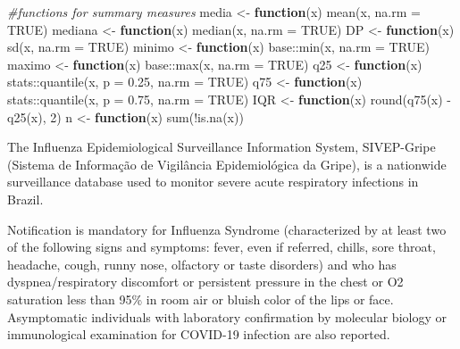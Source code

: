 \documentclass[
]{article}
\newenvironment{Shaded}{\begin{snugshade}}{\end{snugshade}}
\newcommand{\AttributeTok}[1]{\textcolor[rgb]{0.77,0.63,0.00}{#1}}
\newcommand{\CommentTok}[1]{\textcolor[rgb]{0.56,0.35,0.01}{\textit{#1}}}
\newcommand{\ConstantTok}[1]{\textcolor[rgb]{0.00,0.00,0.00}{#1}}
\newcommand{\ControlFlowTok}[1]{\textcolor[rgb]{0.13,0.29,0.53}{\textbf{#1}}}
\newcommand{\DecValTok}[1]{\textcolor[rgb]{0.00,0.00,0.81}{#1}}
\newcommand{\FloatTok}[1]{\textcolor[rgb]{0.00,0.00,0.81}{#1}}
\newcommand{\FunctionTok}[1]{\textcolor[rgb]{0.00,0.00,0.00}{#1}}
\newcommand{\NormalTok}[1]{#1}
\newcommand{\OtherTok}[1]{\textcolor[rgb]{0.56,0.35,0.01}{#1}}
\newcommand{\SpecialCharTok}[1]{\textcolor[rgb]{0.00,0.00,0.00}{#1}}
\begin{document}
\begin{Shaded}
\begin{Highlighting}[]
\CommentTok{\#functions for summary measures}
\NormalTok{media }\OtherTok{\textless{}{-}} \ControlFlowTok{function}\NormalTok{(x)}
  \FunctionTok{mean}\NormalTok{(x, }\AttributeTok{na.rm =} \ConstantTok{TRUE}\NormalTok{)}
\NormalTok{mediana }\OtherTok{\textless{}{-}} \ControlFlowTok{function}\NormalTok{(x)}
  \FunctionTok{median}\NormalTok{(x, }\AttributeTok{na.rm =} \ConstantTok{TRUE}\NormalTok{)}
\NormalTok{DP }\OtherTok{\textless{}{-}} \ControlFlowTok{function}\NormalTok{(x)}
  \FunctionTok{sd}\NormalTok{(x, }\AttributeTok{na.rm =} \ConstantTok{TRUE}\NormalTok{)}
\NormalTok{minimo }\OtherTok{\textless{}{-}} \ControlFlowTok{function}\NormalTok{(x)}
\NormalTok{  base}\SpecialCharTok{::}\FunctionTok{min}\NormalTok{(x, }\AttributeTok{na.rm =} \ConstantTok{TRUE}\NormalTok{)}
\NormalTok{maximo }\OtherTok{\textless{}{-}} \ControlFlowTok{function}\NormalTok{(x)}
\NormalTok{  base}\SpecialCharTok{::}\FunctionTok{max}\NormalTok{(x, }\AttributeTok{na.rm =} \ConstantTok{TRUE}\NormalTok{)}
\NormalTok{q25 }\OtherTok{\textless{}{-}} \ControlFlowTok{function}\NormalTok{(x)}
\NormalTok{  stats}\SpecialCharTok{::}\FunctionTok{quantile}\NormalTok{(x, }\AttributeTok{p =} \FloatTok{0.25}\NormalTok{, }\AttributeTok{na.rm =} \ConstantTok{TRUE}\NormalTok{)}
\NormalTok{q75 }\OtherTok{\textless{}{-}} \ControlFlowTok{function}\NormalTok{(x)}
\NormalTok{  stats}\SpecialCharTok{::}\FunctionTok{quantile}\NormalTok{(x, }\AttributeTok{p =} \FloatTok{0.75}\NormalTok{, }\AttributeTok{na.rm =} \ConstantTok{TRUE}\NormalTok{)}
\NormalTok{IQR }\OtherTok{\textless{}{-}} \ControlFlowTok{function}\NormalTok{(x)}
  \FunctionTok{round}\NormalTok{(}\FunctionTok{q75}\NormalTok{(x) }\SpecialCharTok{{-}} \FunctionTok{q25}\NormalTok{(x), }\DecValTok{2}\NormalTok{)}
\NormalTok{n }\OtherTok{\textless{}{-}} \ControlFlowTok{function}\NormalTok{(x)}
  \FunctionTok{sum}\NormalTok{(}\SpecialCharTok{!}\FunctionTok{is.na}\NormalTok{(x))}
\end{Highlighting}
\end{Shaded}

The Influenza Epidemiological Surveillance Information System,
SIVEP-Gripe (Sistema de Informação de Vigilância Epidemiológica da
Gripe), is a nationwide surveillance database used to monitor severe
acute respiratory infections in Brazil.

Notification is mandatory for Influenza Syndrome (characterized by at
least two of the following signs and symptoms: fever, even if referred,
chills, sore throat, headache, cough, runny nose, olfactory or taste
disorders) and who has dyspnea/respiratory discomfort or persistent
pressure in the chest or O2 saturation less than 95\% in room air or
bluish color of the lips or face. Asymptomatic individuals with
laboratory confirmation by molecular biology or immunological
examination for COVID-19 infection are also reported.
\end{document}
